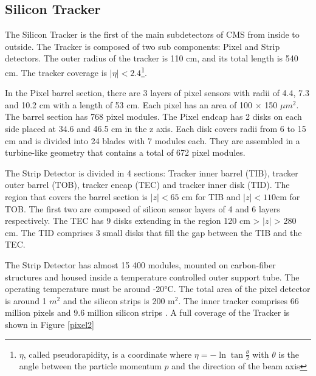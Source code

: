 \subsection{Silicon Tracker}
The Silicon Tracker is the first of the main subdetectors of CMS from inside to outside. The Tracker is composed of two sub components: Pixel and Strip detectors. The outer radius of the tracker is 110 cm, and its total length is 540 cm. The tracker coverage is $|\eta|<2.4$\footnote{$\eta$, called pseudorapidity, is a coordinate where $\eta=-\ln{\tan{\frac{\theta}{2}}}$ with $\theta$ is the angle between the particle momentum $p$ and the direction of the beam axis}.

In the Pixel barrel section, there are 3 layers of pixel sensors with radii of 4.4, 7.3 and 10.2 cm with a length of 53 cm. Each pixel has an area of 100 $\times$ 150 $\mu m^2$. The barrel section has 768 pixel modules.
The Pixel endcap has 2 disks on each side placed at 34.6 and 46.5 cm in the z axis. Each disk covers radii from 6 to 15 cm and is divided into 24 blades with 7 modules each.
They are assembled in a turbine-like geometry that contains a total of 672 pixel modules. %


The Strip Detector is divided in 4 sections: Tracker inner barrel (TIB), tracker outer barrel (TOB), tracker encap (TEC) and tracker inner disk (TID). The region that covers the barrel section is $|z|<65$ cm for TIB and $|z|<110$cm for TOB. The first two are composed of silicon sensor layers of 4 and 6 layers respectively. The TEC has 9 disks extending in the region 120 cm > $|z|$ > 280 cm. The 
TID comprises 3 small disks that fill the gap between the TIB and the TEC.


The Strip Detector has almost 15 400 modules, mounted on
carbon-fiber structures and housed inside a temperature controlled outer support tube. The operating temperature must be around -$\ang{20}$C. 
The total area of the pixel detector is around 1 $m^2$ and the silicon strips is 200 m$^2$. 
The inner tracker comprises 66 million pixels and 9.6
million silicon strips \cite{cms-manual}.
A full coverage of the Tracker is shown in Figure \ref{pixel2}


